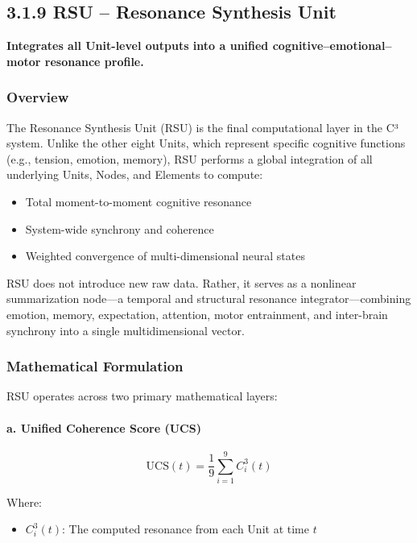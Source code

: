 \subsection*{3.1.9 RSU – Resonance Synthesis Unit}

\textbf{Integrates all Unit-level outputs into a unified cognitive–emotional–motor resonance profile.}

\subsubsection*{Overview}

The Resonance Synthesis Unit (RSU) is the final computational layer in the C³ system. Unlike the other eight Units, which represent specific cognitive functions (e.g., tension, emotion, memory), RSU performs a global integration of all underlying Units, Nodes, and Elements to compute:

\begin{itemize}
    \item Total moment-to-moment cognitive resonance
    \item System-wide synchrony and coherence
    \item Weighted convergence of multi-dimensional neural states
\end{itemize}

RSU does not introduce new raw data. Rather, it serves as a nonlinear summarization node—a temporal and structural resonance integrator—combining emotion, memory, expectation, attention, motor entrainment, and inter-brain synchrony into a single multidimensional vector.

\subsubsection*{Mathematical Formulation}

RSU operates across two primary mathematical layers:

\paragraph{a. Unified Coherence Score (UCS)}

\[
\text{UCS}(t) = \frac{1}{9} \sum_{i=1}^{9} C^3_i(t)
\]

Where:

\begin{itemize}
    \item $C^3_i(t)$: The computed resonance from each Unit at time $t$
\end{itemize}

